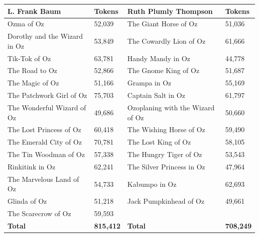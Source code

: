 \documentclass[11pt]{article}
\begin{document}
\begin{center}
\begin{tabular}{@{}ll|ll@{}}
\toprule
\textbf{L. Frank Baum} & \textbf{Tokens} & \textbf{Ruth Plumly Thompson} & \textbf{Tokens} \\
\midrule
Ozma of Oz & 52,039 & The Giant Horse of Oz & 51,036 \\
Dorothy and the Wizard in Oz & 53,849 & The Cowardly Lion of Oz & 61,666 \\
Tik-Tok of Oz & 63,781 & Handy Mandy in Oz & 44,778 \\
The Road to Oz & 52,866 & The Gnome King of Oz & 51,687 \\
The Magic of Oz & 51,166 & Grampa in Oz & 55,169 \\
The Patchwork Girl of Oz & 75,703 & Captain Salt in Oz & 61,797 \\
The Wonderful Wizard of Oz & 49,686 & Ozoplaning with the Wizard of Oz & 50,660 \\
The Lost Princess of Oz & 60,418 & The Wishing Horse of Oz & 59,490 \\
The Emerald City of Oz & 70,781 & The Lost King of Oz & 58,105 \\
The Tin Woodman of Oz & 57,338 & The Hungry Tiger of Oz & 53,543 \\
Rinkitink in Oz & 62,241 & The Silver Princess in Oz & 47,964 \\
The Marvelous Land of Oz & 54,733 & Kabumpo in Oz & 62,693 \\
Glinda of Oz & 51,218 & Jack Pumpkinhead of Oz & 49,661 \\
The Scarecrow of Oz & 59,593 & & \\
\textbf{Total} & \textbf{815,412} & \textbf{Total} & \textbf{708,249} \\
\bottomrule
\end{tabular}

\end{center}



\newpage
\end{document}
